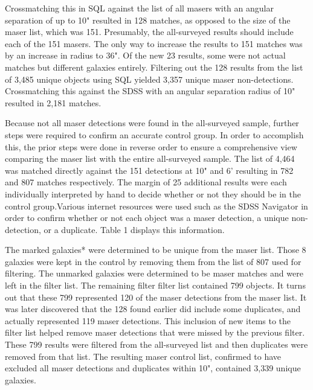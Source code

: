 \documentclass[10pt]{article}
\begin{document}
\begin{multicols}{2}
Crossmatching this in SQL against the list of all masers with an angular separation of up to 10" resulted in 128 matches, as opposed to the size of the maser list, which was 151. Presumably, the all-surveyed results should include each of the 151 masers. The only way to increase the results to 151 matches was by an increase in radius to 36". Of the new 23 results, some were not actual matches but different galaxies entirely. Filtering out the 128 results from the list of 3,485 unique objects using SQL yielded 3,357 unique maser non-detections. Crossmatching this against the SDSS with an angular separation radius of 10" resulted in 2,181 matches.

Because not all maser detections were found in the all-surveyed sample, further steps were required to confirm an accurate control group. In order to accomplish this, the prior steps were done in reverse order to ensure a comprehensive view comparing the maser list with the entire all-surveyed sample. The list of 4,464 was matched directly against the 151 detections at 10" and 6' resulting in 782 and 807 matches respectively. The margin of 25 additional results were each individually interpreted by hand to decide whether or not they should be in the control group.Various internet resources were used such as the SDSS Navigator\cite{navigator} in order to confirm whether or not each object was a maser detection, a unique non-detection, or a duplicate. Table 1 displays this information.

The marked galaxies* were determined to be unique from the maser list. Those 8 galaxies were kept in the control by removing them from the list of 807 used for filtering. The unmarked galaxies were determined to be maser matches and were left in the filter list. The remaining filter filter list contained 799 objects. It turns out that these 799 represented 120 of the maser detections from the maser list. It was later discovered that the 128 found earlier did include some duplicates, and actually represented 119 maser detections. This inclusion of new items to the filter list helped remove maser detections that were missed by the previous filter. These 799 results were filtered from the all-surveyed list and then duplicates were removed from that list. The resulting maser control list, confirmed to have excluded all maser detections and duplicates within 10", contained 3,339 unique galaxies.

\end{multicols}
\end{document}
